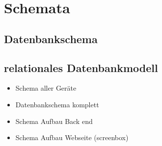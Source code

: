 \section{Schemata}
\subsection{Datenbankschema}\label{anhang:Datenbankschema}
\subsection{relationales Datenbankmodell}\label{anhang:relationalesDatenbankmodell}

\begin{itemize}
	\item Schema aller Geräte
	\item Datenbankschema komplett
	\item Schema Aufbau Back end
	\item Schema Aufbau Webseite (screenbox)
\end{itemize}
